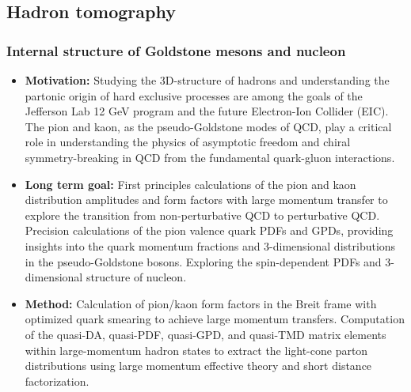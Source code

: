 \documentclass[12pt,hyperpdf]{article}
\begin{document}
\subsection{Hadron tomography}

\subsubsection{Internal structure of Goldstone mesons and nucleon}
\begin{itemize}
    \item{\bf Motivation:} Studying the 3D-structure of hadrons and understanding the partonic origin of hard exclusive processes are among the goals of the Jefferson Lab 12 GeV program and the future Electron-Ion Collider (EIC). The pion and kaon, as the pseudo-Goldstone modes of QCD, play a critical role in understanding the physics of asymptotic freedom and chiral symmetry-breaking in QCD from the fundamental quark-gluon interactions.
    
    \item{\bf Long term goal:} First principles calculations of the pion and kaon distribution amplitudes and form factors with large momentum transfer to explore the transition from non-perturbative QCD to perturbative QCD. Precision calculations of the pion valence quark PDFs and GPDs, providing insights into the quark momentum fractions and 3-dimensional distributions in the pseudo-Goldstone bosons. Exploring the spin-dependent PDFs and 3-dimensional structure of nucleon.
    
    \item{\bf Method:} Calculation of pion/kaon form factors in the Breit frame with optimized quark smearing to achieve large momentum transfers. Computation of the quasi-DA, quasi-PDF, quasi-GPD, and quasi-TMD matrix elements within large-momentum hadron states to extract the light-cone parton distributions using large momentum effective theory and short distance factorization.
      

\end{itemize}
\end{document}
